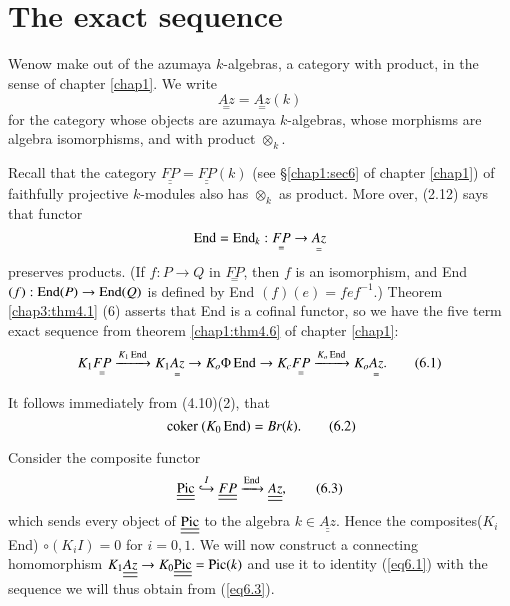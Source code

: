 \section{The exact sequence}\label{chap3:sec6} %
 
We\pageoriginale now make out of the azumaya $k$-algebras, a category
with product, in the sense of chapter \ref{chap1}. We write   
$$
\underset{=}{Az} = \underset{=}{Az}(k)
$$
for the category  whose objects are azumaya $k$-algebras, whose
morphisms are algebra isomorphisms, and with product $\otimes_k$. 
 
Recall that the category $\underline{\underline{FP}} =
\underline{\underline{FP}}(k)$ (see 
\S \ref{chap1:sec6} of chapter \ref{chap1}) of faithfully projective
$k$-modules also has $\otimes_k$ as product. More over, (2.12) says
that functor  
$$
\operatorname{End}= \operatorname{End}_k : \underset{=}{FP} \to \underset{=}{Az}
$$
preserves products. (If $f:P \to Q$ in $\underset{=}{FP}$, then $f$ is
an isomorphism, and End $(f):  \operatorname{End} (P) \to \operatorname{End} (Q)$ is defined by
End $(f) (e) = fef^{-1}$.) Theorem \ref{chap3:thm4.1} (6) asserts that End is a
cofinal functor, so we have the five term exact sequence from theorem
\ref{chap1:thm4.6} of chapter \ref{chap1}: 
\begin{equation*}
K_1 \underset{=}{FP} \xrightarrow{K_1 \operatorname{End}}  K_1 \underset{=}{Az} \to K_o 
\Phi \operatorname{End} \to K_c \underset{=}{FP} \xrightarrow{K_o \operatorname{End}} K_o
\underset{=}{Az}. \tag{6.1}\label{eq6.1} 
\end{equation*} 
 
It follows immediately from (4.10)(2), that 
\begin{equation*}
\text{ coker } (K_0 \operatorname{End} ) = Br (k). \tag{6.2}\label{eq6.2}
\end{equation*} 
 
Consider the composite functor
\begin{equation*}
\underline{\underline{\operatorname{Pic}}} \overset{I}\hookrightarrow
\underline{\underline{FP}} 
\xrightarrow{\operatorname{End}} \underline{\underline{Az}}, \tag{6.3}\label{eq6.3}  
\end{equation*} 
which sends every  object of $\underline{\underline{\operatorname{Pic}}}$ to the
algebra $k \in 
\underline{\underline{Az}}$. Hence the composites\pageoriginale ($K_i$
End) $\circ (K_i I) = 0$ for $i = 
0, 1$. We will now construct a connecting homomorphism $K_1
\underline{\underline{Az}} \to K_0 \underline{\underline{\operatorname{Pic}}} = \operatorname{Pic}
(k)$ and use it to identity (\ref{eq6.1}) with the sequence we will thus
obtain from (\ref{eq6.3}).  

